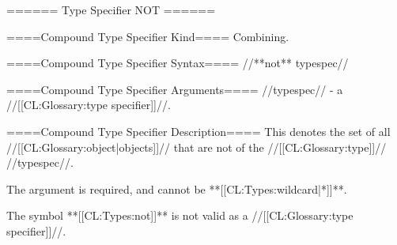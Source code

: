 ====== Type Specifier NOT ======

====Compound Type Specifier Kind====
Combining.

====Compound Type Specifier Syntax====
//**not** typespec//

====Compound Type Specifier Arguments====
//typespec// - a //[[CL:Glossary:type specifier]]//.

====Compound Type Specifier Description====
This denotes the set of all //[[CL:Glossary:object|objects]]// that are not of the //[[CL:Glossary:type]]// //typespec//.

The argument is required, and cannot be **[[CL:Types:wildcard|*]]**.

The symbol **[[CL:Types:not]]** is not valid as a //[[CL:Glossary:type specifier]]//.

